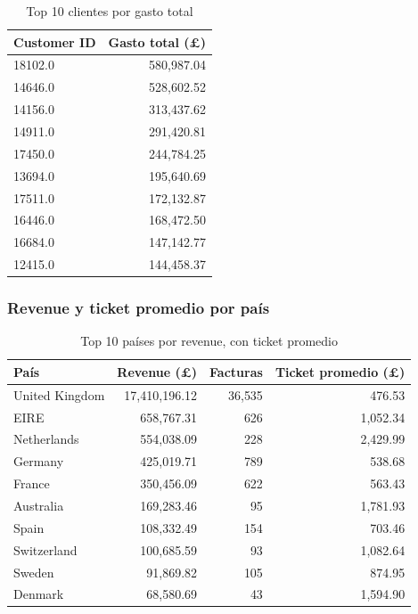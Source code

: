 \begin{table}[H]
\centering
\small
\begin{tabular}{lr}
\toprule
\textbf{Customer ID} & \textbf{Gasto total (£)} \\
\midrule
18102.0 & 580{,}987.04 \\
14646.0 & 528{,}602.52 \\
14156.0 & 313{,}437.62 \\
14911.0 & 291{,}420.81 \\
17450.0 & 244{,}784.25 \\
13694.0 & 195{,}640.69 \\
17511.0 & 172{,}132.87 \\
16446.0 & 168{,}472.50 \\
16684.0 & 147{,}142.77 \\
12415.0 & 144{,}458.37 \\
\bottomrule
\end{tabular}
\caption{Top 10 clientes por gasto total}
\end{table}

\subsubsection*{Revenue y ticket promedio por país}

\begin{table}[H]
\centering
\small
\begin{tabular}{lrrr}
\toprule
\textbf{País} & \textbf{Revenue (£)} & \textbf{Facturas} & \textbf{Ticket promedio (£)} \\
\midrule
United Kingdom & 17{,}410{,}196.12 & 36{,}535 & 476.53 \\
EIRE & 658{,}767.31 & 626 & 1{,}052.34 \\
Netherlands & 554{,}038.09 & 228 & 2{,}429.99 \\
Germany & 425{,}019.71 & 789 & 538.68 \\
France & 350{,}456.09 & 622 & 563.43 \\
Australia & 169{,}283.46 & 95 & 1{,}781.93 \\
Spain & 108{,}332.49 & 154 & 703.46 \\
Switzerland & 100{,}685.59 & 93 & 1{,}082.64 \\
Sweden & 91{,}869.82 & 105 & 874.95 \\
Denmark & 68{,}580.69 & 43 & 1{,}594.90 \\
\bottomrule
\end{tabular}
\caption{Top 10 países por revenue, con ticket promedio}
\end{table}

